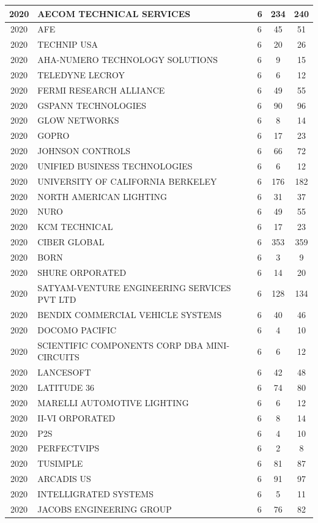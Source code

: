 \documentclass{article}%
\begin{document}
\begin{longtable}{c|p{20em}|p{5em}|c|c}
\hline%
2020&AECOM TECHNICAL SERVICES&6&234&240\\%
\hline%
2020&AFE&6&45&51\\%
\hline%
2020&TECHNIP USA&6&20&26\\%
\hline%
2020&AHA{-}NUMERO TECHNOLOGY SOLUTIONS&6&9&15\\%
\hline%
2020&TELEDYNE LECROY&6&6&12\\%
\hline%
2020&FERMI RESEARCH ALLIANCE&6&49&55\\%
\hline%
2020&GSPANN TECHNOLOGIES&6&90&96\\%
\hline%
2020&GLOW NETWORKS&6&8&14\\%
\hline%
2020&GOPRO&6&17&23\\%
\hline%
2020&JOHNSON CONTROLS&6&66&72\\%
\hline%
2020&UNIFIED BUSINESS TECHNOLOGIES&6&6&12\\%
\hline%
2020&UNIVERSITY OF CALIFORNIA BERKELEY&6&176&182\\%
\hline%
2020&NORTH AMERICAN LIGHTING&6&31&37\\%
\hline%
2020&NURO&6&49&55\\%
\hline%
2020&KCM TECHNICAL&6&17&23\\%
\hline%
2020&CIBER GLOBAL&6&353&359\\%
\hline%
2020&BORN&6&3&9\\%
\hline%
2020&SHURE ORPORATED&6&14&20\\%
\hline%
2020&SATYAM{-}VENTURE ENGINEERING SERVICES PVT LTD&6&128&134\\%
\hline%
2020&BENDIX COMMERCIAL VEHICLE SYSTEMS&6&40&46\\%
\hline%
2020&DOCOMO PACIFIC&6&4&10\\%
\hline%
2020&SCIENTIFIC COMPONENTS CORP DBA MINI{-}CIRCUITS&6&6&12\\%
\hline%
2020&LANCESOFT&6&42&48\\%
\hline%
2020&LATITUDE 36&6&74&80\\%
\hline%
2020&MARELLI AUTOMOTIVE LIGHTING&6&6&12\\%
\hline%
2020&II{-}VI ORPORATED&6&8&14\\%
\hline%
2020&P2S&6&4&10\\%
\hline%
2020&PERFECTVIPS&6&2&8\\%
\hline%
2020&TUSIMPLE&6&81&87\\%
\hline%
2020&ARCADIS US&6&91&97\\%
\hline%
2020&INTELLIGRATED SYSTEMS&6&5&11\\%
\hline%
2020&JACOBS ENGINEERING GROUP&6&76&82\\%

\end{longtable}
\end{document}

